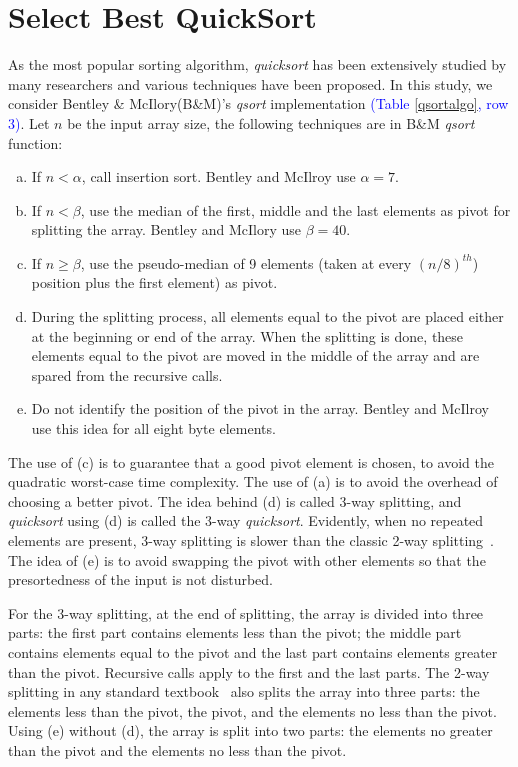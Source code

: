\documentclass[AMA,STIX1COL]{WileyNJD-v2}
\newcommand{\qusort}{\emph{quicksort }}
\newcommand{\qusortn}{\emph{quicksort}}
\newcommand{\qsort}{\emph{qsort }}
\begin{document}
\section{Select Best QuickSort}       
As the most popular sorting algorithm, \qusort has been extensively studied by many researchers and various techniques have been proposed. 
In this study, we consider Bentley \& McIlory(B\&M)’s \qsort implementation \textcolor{blue}{(Table \ref{qsortalgo}, row 3)}. 
Let $n$ be the input array size, the following techniques are in B\&M \qsort function: 

\begin{enumerate}[(a)]
\item If $n < \alpha$, call insertion sort. Bentley and McIlroy use $\alpha = 7$.
\item If $n < \beta$, use the median of the first, middle and the last elements as pivot for splitting the array. Bentley and McIlory use $\beta = 40$.
\item If $n \geq \beta$, use the pseudo-median of 9 elements (taken at every $(n/8)^{th}$) position plus the first element) as pivot.
\item During the splitting process, all elements equal to the pivot are placed either at the beginning or end of the array. When the splitting is done, these elements equal to the pivot are moved in the middle of the array and are spared from the recursive calls.
\item Do not identify the position of the pivot in the array. Bentley and McIlroy use this idea for all eight byte elements.
\end{enumerate}

The use of (c) is to guarantee that a good pivot element is chosen, to avoid the quadratic worst-case time complexity.  
The use of (a) is to avoid the overhead of choosing a better pivot. The idea behind (d) is called 3-way splitting, and \qusort using (d) is called the 3-way \qusortn. 
Evidently, when no repeated elements are present, 3-way splitting is slower than the classic 2-way splitting~\cite{10.5555/1614191}. 
The idea of (e) is to avoid swapping the pivot with other elements so that the presortedness of the input is not disturbed. 

For the 3-way splitting, at the end of splitting, the array is divided into three parts: the first part contains elements less than the pivot; the middle part contains elements equal to the pivot and the last part contains elements greater than the pivot. 
Recursive calls apply to the first and the last parts. 
The 2-way splitting in any standard textbook~\cite{10.5555/1614191} also splits the array into three parts: the elements less than the pivot, the pivot, and the elements no less than the pivot. 
Using (e) without (d), the array is split into two parts: the elements no greater than the pivot and the elements no less than the pivot. 
\end{document}

